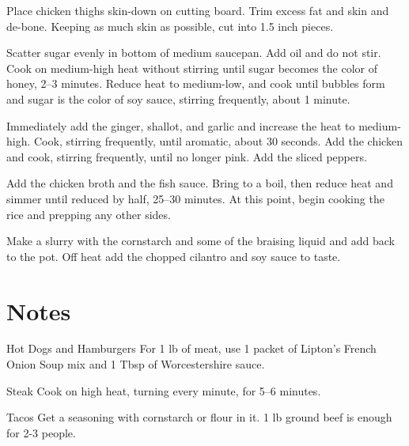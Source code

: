 \documentclass[oneside]{book}  %
\def\thisrecipe{}  %
\newcommand{\recipe}[1]{\section{#1}\def\thisrecipe{: #1}} %
\begin{document}
\begin{directions}
  \item Place chicken thighs skin-down on cutting board. Trim excess fat and
    skin and de-bone. Keeping as much skin as possible, cut into 1.5 inch
    pieces.

  \item Scatter sugar evenly in bottom of medium saucepan. Add oil and do not
    stir. Cook on medium-high heat without stirring until sugar becomes the
    color of honey, 2--3 minutes. Reduce heat to medium-low, and cook until
    bubbles form and sugar is the color of soy sauce, stirring frequently, about
    1 minute.

  \item Immediately add the ginger, shallot, and garlic and increase the heat to
    medium-high. Cook, stirring frequently, until aromatic, about 30 seconds.
    Add the chicken and cook, stirring frequently, until no longer pink. Add the
    sliced peppers.

  \item Add the chicken broth and the fish sauce. Bring to a boil, then reduce
    heat and simmer until reduced by half, 25--30 minutes. At this point, begin
    cooking the rice and prepping any other sides.

  \item Make a slurry with the cornstarch and some of the braising liquid and
    add back to the pot. Off heat add the chopped cilantro and soy sauce to
    taste.
\end{directions}
\recipe{Notes} \label{notes:dinners_standalone} %
\begin{kitchennotes}
  \item[Hot Dogs and Hamburgers]  
    For 1 lb of meat, use 1 packet of Lipton's French Onion Soup mix and 1 Tbsp
    of Worcestershire sauce.
  \item[Steak]  
    Cook on high heat, turning every minute, for 5--6 minutes.
  \item[Tacos]  
    Get a seasoning with cornstarch or flour in it. 1 lb ground beef is enough
    for 2-3 people.
\end{kitchennotes}
\end{document}
